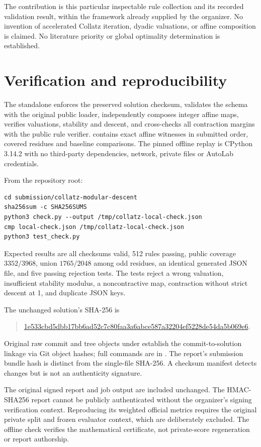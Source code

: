 \documentclass[10pt]{article}
\newcommand{\file}[1]{\path{#1}}
\begin{document}
The contribution is this particular inspectable rule collection and its recorded validation result, within the framework already supplied by the organizer. No invention of accelerated Collatz iteration, dyadic valuations, or affine composition is claimed. No literature priority or global optimality determination is established.

\section{Verification and reproducibility}
The standalone \file{check.py} enforces the preserved solution checksum, validates the schema with the original public loader, independently composes integer affine maps, verifies valuations, stability and descent, and cross-checks all contraction margins with the public rule verifier. \file{local-check.json} contains exact affine witnesses in submitted order, covered residues and baseline comparisons. The pinned offline replay is CPython 3.14.2 with no third-party dependencies, network, private files or AutoLab credentials.

From the repository root:
\begin{verbatim}
cd submission/collatz-modular-descent
sha256sum -c SHA256SUMS
python3 check.py --output /tmp/collatz-local-check.json
cmp local-check.json /tmp/collatz-local-check.json
python3 test_check.py
\end{verbatim}
Expected results are all checksums valid, 512 rules passing, public coverage $3352/3968$, union $1765/2048$ among odd residues, an identical generated JSON file, and five passing rejection tests. The tests reject a wrong valuation, insufficient stability modulus, a noncontractive map, contraction without strict descent at 1, and duplicate JSON keys.

The unchanged solution's SHA-256 is
\begin{quote}\small
\url{1e533cbd5dbb17bb6ad52c7c80faa3a6abce587a32204ef5228de54da5b069e6}.
\end{quote}
Original raw commit and tree objects under \file{evidence/} establish the commit-to-solution linkage via Git object hashes; full commands are in \file{REPRODUCE.md}. The report's submission bundle hash is distinct from the single-file SHA-256. A checksum manifest detects changes but is not an authenticity signature.

The original signed report and job output are included unchanged. The HMAC-SHA256 report cannot be publicly authenticated without the organizer's signing verification context. Reproducing its weighted official metrics requires the original private split and frozen evaluator context, which are deliberately excluded. The offline check verifies the mathematical certificate, not private-score regeneration or report authorship.
\end{document}
